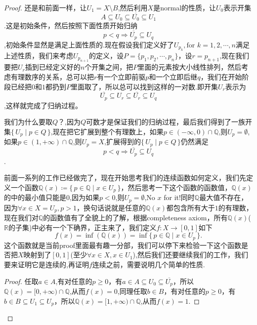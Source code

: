 \documentclass{article}
\newenvironment{claim}[1]{\par\noindent\underline{Claim:}\space#1}{}
\newcommand*{\xfunc}[4]{{#2}\colon{#3}{#1}{#4}}
\newcommand*{\func}[3]{\xfunc{\to}{#1}{#2}{#3}}
\newcommand\Set[2]{\{\,#1\mid#2\,\}} %
\begin{document}
\begin{proof}
还是和前面一样，让$U_1 = X \setminus B$,然后利用$X$是normal的性质，让$U_0$表示开集\[A \subseteq U_0 \subseteq \overline{U_0} \subseteq U_1\].这是初始条件，然后按照下面性质开始归纳\[p < q \Rightarrow \overline{U_p} \subseteq {U_q}\],初始条件显然是满足上面性质的.现在假设我们定义好了$U_{p_k},\text{for } k=1,2,\cdots,n$满足上述性质，我们来考虑$U_{p_{n+1}}$的定义，设$P=\{p_1,p_2,\cdots,p_n\}$，设$r = p_{n+1}$,现在我们要把$U_r$插到已经定义好的$n$个开集之间，把$P$里面的元素按大小线性排列，然后考虑有理数序的关系，总可以把$r$有一个立即前驱$p$和一个立即后继$q$，我们在开始阶段已经把$0$和$1$都扔到$P$里面取了，所以总可以找到这样的一对数.即开集$U_r$表示为\[\overline{U_p} \subseteq U_r \subseteq \overline{U_r} \subseteq U_q\],这样就完成了归纳过程。

我们为什么要取$Q$？,因为$Q$可数才是保证我们的归纳过程，最后我们得到了一族开集$\Set{U_p}{p \in Q}$,现在把它扩展到整个有理数上，如果$p \in (-\infty,0) \cap \mathbb{Q}$,则$U_p=\emptyset$,如果$p \in (1,+\infty) \cap \mathbb{Q}$,则$U_p = X$,扩展得到的$\Set{U_p}{p \in Q}$仍然满足\[p < q \Rightarrow \overline{U_p} \subseteq {U_q}\].

前面一系列的工作已经做完了，现在开始思考我们的连续函数如何定义，我们先定义一个函数$\mathbb{Q}(x) \coloneqq \Set{p \in \mathbb{Q}}{x \in U_p}$，然后思考一下这个函数的函数值，$\mathbb{Q}(x)$的中的最小值只能是$0$,因为如果$p < 0$,则$U_p = \emptyset$,No $x$ for it!同时$\mathbb{Q}$最大值不存在，因为$\forall x \in X=U_p,p>1$，换句话说就是任意的$\mathbb{Q}(x)$都包含所有大于$1$的有理数，现在我们对$\mathbb{Q}$的函数值有了全貌上的了解，根据completeness axiom，所有$\mathbb{Q}(x)$($\mathbb{R}$的子集)中必有一个下确界，正主来了，我们定义$\func{f}{X}{[0,1]}$如下\[f(x) = \inf(\mathbb{Q}(x)) = \inf\Set{p \in \mathbb{Q}}{x \in U_p}.\]这个函数就是当前proof里面最有趣一分部，我们可以停下来检验一下这个函数是否把$X$映射到了$[0,1]$(至少$\forall x \in X,x \in U_1$),然后我们还要继续我们的工作，我们要来证明它是连续的,再证明$f$连续之前，需要说明几个简单的性质.

\begin{proof}
任取$a \in A$,有对任意的$p \geq 0$，有$a \in A \subseteq U_0 \subseteq \overline{U_p}$，所以$\mathbb{Q}(x) = [0,+\infty) \cap \mathbb{Q}$,从而$f(x)=0$,同理任取$b \in B$，有对任意的$p \geq 0$，有$b \in B \subseteq U_1 \subseteq U_p$，所以$\mathbb{Q}(x) = [1,+\infty) \cap \mathbb{Q}$,从而$f(x)=1$.
\end{proof}


\end{proof}
\end{document}
